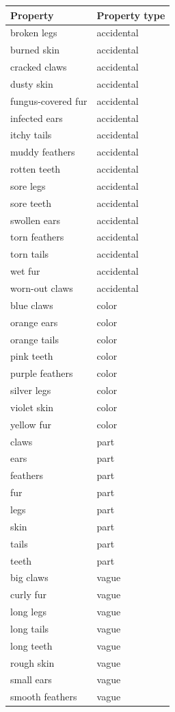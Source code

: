 \documentclass[floatsintext,man]{apa6}
\begin{document}
\endgroup


\begingroup\fontsize{11pt}{12pt}\selectfont

\begin{longtable}{ |p{3in}| |p{2 in}|}
  \hline
{\bfseries Property} & {\bfseries Property type} \\ 
  \hline
broken legs & accidental \\ 
   \hline
burned skin & accidental \\ 
   \hline
cracked claws & accidental \\ 
   \hline
dusty skin & accidental \\ 
   \hline
fungus-covered fur & accidental \\ 
   \hline
infected ears & accidental \\ 
   \hline
itchy tails & accidental \\ 
   \hline
muddy feathers & accidental \\ 
   \hline
rotten teeth & accidental \\ 
   \hline
sore legs & accidental \\ 
   \hline
sore teeth & accidental \\ 
   \hline
swollen ears & accidental \\ 
   \hline
torn feathers & accidental \\ 
   \hline
torn tails & accidental \\ 
   \hline
wet fur & accidental \\ 
   \hline
worn-out claws & accidental \\ 
   \hline
blue claws & color \\ 
   \hline
orange ears & color \\ 
   \hline
orange tails & color \\ 
   \hline
pink teeth & color \\ 
   \hline
purple feathers & color \\ 
   \hline
silver legs & color \\ 
   \hline
violet skin & color \\ 
   \hline
yellow fur & color \\ 
   \hline
claws & part \\ 
   \hline
ears & part \\ 
   \hline
feathers & part \\ 
   \hline
fur & part \\ 
   \hline
legs & part \\ 
   \hline
skin & part \\ 
   \hline
tails & part \\ 
   \hline
teeth & part \\ 
   \hline
big claws & vague \\ 
   \hline
curly fur & vague \\ 
   \hline
long legs & vague \\ 
   \hline
long tails & vague \\ 
   \hline
long teeth & vague \\ 
   \hline
rough skin & vague \\ 
   \hline
small ears & vague \\ 
   \hline
smooth feathers & vague \\ 
   \hline


\end{longtable}
\end{document}
